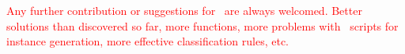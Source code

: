 \textcolor{red}{Any further contribution or suggestions for \siplibtwo\ are always welcomed. Better solutions than discovered so far, more functions, more problems with \julia\ scripts for instance generation, more effective classification rules, etc.}

